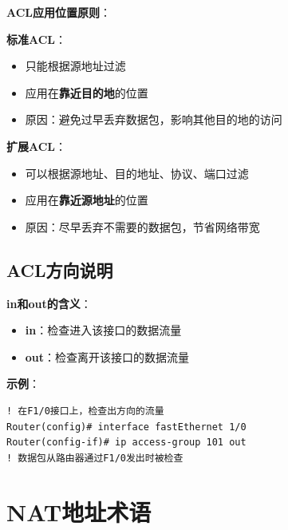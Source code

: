 \documentclass[12pt,a4paper]{ctexart}
\begin{document}
\begin{keybox}
\textbf{ACL应用位置原则}：

\textbf{标准ACL}：
\begin{itemize}[itemsep=0pt]
    \item 只能根据源地址过滤
    \item 应用在\textbf{靠近目的地}的位置
    \item 原因：避免过早丢弃数据包，影响其他目的地的访问
\end{itemize}

\textbf{扩展ACL}：
\begin{itemize}[itemsep=0pt]
    \item 可以根据源地址、目的地址、协议、端口过滤
    \item 应用在\textbf{靠近源地址}的位置
    \item 原因：尽早丢弃不需要的数据包，节省网络带宽
\end{itemize}
\end{keybox}

\subsection{ACL方向说明}

\begin{keybox}
\textbf{in和out的含义}：
\begin{itemize}[itemsep=0pt]
    \item \textbf{in}：检查进入该接口的数据流量
    \item \textbf{out}：检查离开该接口的数据流量
\end{itemize}

\textbf{示例}：
\begin{lstlisting}
! 在F1/0接口上，检查出方向的流量
Router(config)# interface fastEthernet 1/0
Router(config-if)# ip access-group 101 out
! 数据包从路由器通过F1/0发出时被检查
\end{lstlisting}
\end{keybox}

\section{NAT地址术语}
\end{document}
